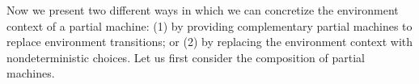 %

Now we present two different ways in which
we can concretize the environment context of a partial machine:
(1) by providing complementary partial machines to replace environment transitions;
or (2) by replacing the environment context with nondeterministic choices.
Let us first consider the composition of partial machines.

